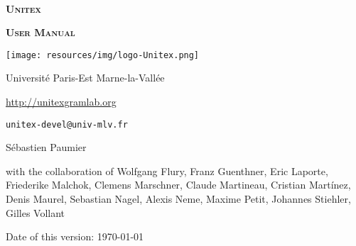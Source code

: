 
\begin{titlepage}
\begin{center}

~

\vspace{3cm}
\Huge
\textsc{\textbf{Unitex \UnitexVersion{}}}

\vspace{1cm}

\huge
\textsc{\textbf{User Manual}}

\vspace{2cm}

  \begin{center}
    \texttt{[image: resources/img/logo-Unitex.png]}
  \end{center}
\normalsize

\vspace{2cm}

\LARGE

Université Paris-Est Marne-la-Vallée
\bigskip
\normalsize

\url{http://unitexgramlab.org}

\verb$unitex-devel@univ-mlv.fr$

\vspace{0.5cm}

Sébastien Paumier
\bigskip

with the collaboration of Wolfgang Flury, Franz Guenthner, Eric Laporte,\\
Friederike Malchok, Clemens Marschner, Claude Martineau, Cristian Martínez,\\
Denis Maurel, Sebastian Nagel, Alexis Neme, Maxime Petit, Johannes Stiehler,\\
Gilles Vollant

\bigskip
\mydate
Date of this version: \today
\end{center}

\end{titlepage}
